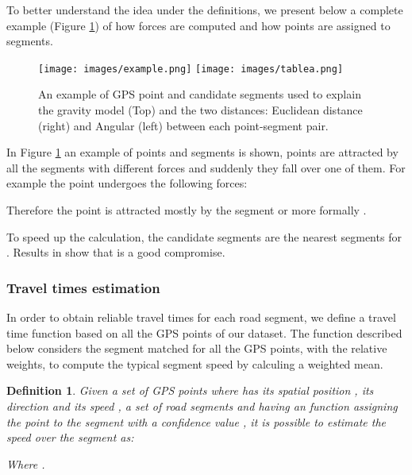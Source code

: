 \documentclass[5p]{elsarticle}
\newtheorem{definition}{Definition}
\begin{document}
To better understand the idea under the definitions, we present below a complete example (Figure  \ref{fig:example}) of how forces are computed and how 
points are assigned to segments.
\begin{figure}[!t]
\begin{center}
\texttt{[image: images/example.png]}
\texttt{[image: images/tablea.png]}
\caption{An example of GPS point and candidate segments used to explain the gravity model (Top) and the two distances: Euclidean distance (right) and Angular (left) 
between each point-segment pair.}\label{fig:example}
\end{center}
\end{figure}
In Figure \ref{fig:example} an example of points and segments is shown, points are attracted by all the segments with different forces and suddenly they fall over one of them.
For example the point  undergoes the following forces: 










Therefore the point is attracted mostly by the segment  or more formally . 

To speed up the calculation, the candidate segments are the  nearest segments for . 
Results in \cite{cintia2013gravity} show that  is a good compromise. 





\subsubsection{Travel times estimation}
In order to obtain reliable travel times for each road segment, we define a travel time function based on all the GPS points of our dataset. The function described below
considers the segment matched for all the GPS points, with the relative weights, to compute the typical segment speed by calculing a weighted mean. 

\begin{definition}
Given a set of GPS points  where  has its spatial position , its direction  and its speed , 
a set of road segments  and having an  function  assigning the point  to 
the segment  with a confidence value , it is possible to estimate the speed over the segment as:
		
Where .
\end{definition}
\end{document}

